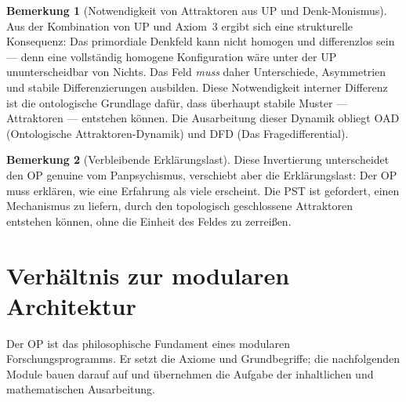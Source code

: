 \documentclass[11pt,a4paper]{article}
\theoremstyle{plain}
\theoremstyle{definition}
\newtheorem{remark}{Bemerkung}[section]
\begin{document}
\begin{remark}[Notwendigkeit von Attraktoren aus UP und Denk-Monismus]
Aus der Kombination von UP und Axiom~3 ergibt sich eine strukturelle Konsequenz: Das
primordiale Denkfeld kann nicht homogen und differenzlos sein --- denn eine vollst\"{a}ndig
homogene Konfiguration w\"{a}re unter der UP ununterscheidbar von Nichts. Das Feld
\emph{muss} daher Unterschiede, Asymmetrien und stabile Differenzierungen ausbilden.
Diese Notwendigkeit interner Differenz ist die ontologische Grundlage daf\"{u}r, dass
\"{u}berhaupt stabile Muster --- Attraktoren --- entstehen k\"{o}nnen. Die Ausarbeitung
dieser Dynamik obliegt OAD (Ontologische Attraktoren-Dynamik) und DFD (Das
Fragedifferential).
\end{remark}

\begin{remark}[Verbleibende Erkl\"{a}rungslast]
Diese Invertierung unterscheidet den OP genuine vom Panpsychismus, verschiebt aber die
Erkl\"{a}rungslast: Der OP muss erkl\"{a}ren, wie eine Erfahrung als viele erscheint.
Die PST ist gefordert, einen Mechanismus zu liefern, durch den topologisch geschlossene
Attraktoren entstehen k\"{o}nnen, ohne die Einheit des Feldes zu zerrei\ss{}en.
\end{remark}

\section{Verh\"{a}ltnis zur modularen Architektur}

Der OP ist das philosophische Fundament eines modularen Forschungsprogramms. Er setzt
die Axiome und Grundbegriffe; die nachfolgenden Module bauen darauf auf und \"{u}bernehmen
die Aufgabe der inhaltlichen und mathematischen Ausarbeitung.
\end{document}
